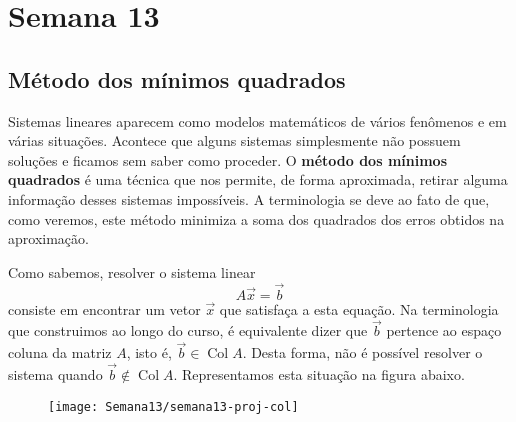 

\providecommand{\dir}{..}


%



\chapter{Semana 13}

\section{Método dos mínimos quadrados}

Sistemas lineares aparecem como modelos matemáticos de vários fenômenos e em várias situações. Acontece que alguns sistemas simplesmente não possuem soluções e ficamos sem saber como proceder. O \textbf{método dos mínimos quadrados} é uma técnica que nos permite, de forma aproximada, retirar alguma informação desses sistemas impossíveis. A terminologia se deve ao fato de que, como veremos, este método minimiza a soma dos quadrados dos erros obtidos na aproximação.

Como sabemos, resolver o sistema linear
\begin{equation}
A \vec{x} = \vec{b}
\end{equation} consiste em encontrar um vetor $\vec{x}$ que satisfaça a esta equação. Na terminologia que construimos ao longo do curso, é equivalente dizer que $\vec{b}$ pertence ao espaço coluna da matriz $A$, isto é, $\vec{b} \in \operatorname{Col} A$. Desta forma, não é possível resolver o sistema quando $\vec{b} \not\in \operatorname{Col} A$. Representamos esta situação na figura abaixo.
\begin{figure}[h!]
  \begin{center}
    \texttt{[image: Semana13/semana13-proj-col]}
  \end{center}
\end{figure}


